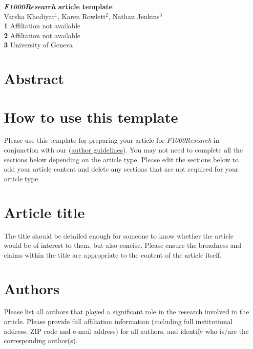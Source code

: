 \documentclass[10pt]{article}
\date{}
\begin{document}
\begin{flushleft}
{\LARGE
\textbf{\emph{F1000Research} article template}
}
\\
Varsha Khodiyar$^{1}$, Karen Rowlett$^{2}$, Nathan Jenkins$^{3}$
\\
{\bf 1} Affiliation not available
\\


{\bf 2} Affiliation not available
\\
{\bf 3} University of Geneva
\\
\end{flushleft}

\section*{Abstract}



\section*{How to use this template}
Please use this template for preparing your article for {\it F1000Research} in conjunction with our  (\href{http://f1000research.com/author-guidelines}{author guidelines}).
You may not need to complete all the sections below depending on the article type.
Please edit the sections below to add your article content and delete any sections that are not required for your article type.

\section*{Article title}
The title should be detailed enough for someone to know whether the article would be of interest to them, but also concise. Please ensure the broadness and claims within the title are appropriate to the content of the article itself.

\section*{Authors}
Please list all authors that played a significant role in the research involved in the article. Please provide full affiliation information (including full institutional address, ZIP code and e-mail address) for all authors, and identify who is/are the corresponding author(s).
\end{document}
